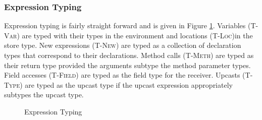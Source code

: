 \documentclass[11pt
              , a4paper
              , twoside
              , openright
              ]{report}
\numberwithin{case}{theorem}
\numberwithin{subcase}{case}
\begin{document}
\subsubsection{Expression Typing}
Expression typing is fairly straight forward and is 
given in Figure \ref{f:e_typ}. Variables (\textsc{T-Var})
are typed with their types in the environment and 
locations (\textsc{T-Loc})in the store type. New 
expressions (\textsc{T-New}) are typed as a collection 
of declaration types that correspond to their declarations. 
Method calls (\textsc{T-Meth}) are typed as their 
return type provided the arguments 
subtype the method parameter types. Field accesses 
(\textsc{T-Field}) are typed as the field type for the receiver. 
Upcasts (\textsc{T-Type}) are typed as the upcast type if the 
upcast expression appropriately subtypes the upcast type.
\begin{figure}[t]
\hfill {}
\caption{Expression Typing}
\label{f:e_typ}
\end{figure}
\end{document}
